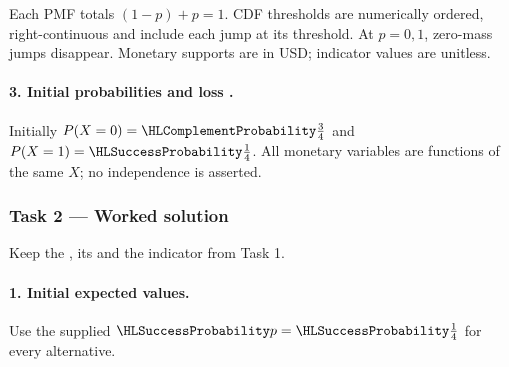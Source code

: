 Each PMF totals $(1-p)+p=1$. CDF thresholds are numerically ordered,
right-continuous and include each jump at its threshold. At $p=0,1$, zero-mass jumps disappear.
Monetary supports are in USD; indicator values are unitless.
\paragraph{3. Initial probabilities and loss \protect{}.}
Initially $P(X=0)=\FailureProb{\frac{3}{4}}$ and $P(X=1)=\SuccessProb{\frac{1}{4}}$.
All monetary variables are functions of the same $X$; no independence is asserted.
\clearpage\subsubsection*{Task 2 --- Worked solution}\label{sol:c3-energy-decision}
Keep the , its  and the indicator from Task 1.
\paragraph{1. Initial expected values.}
Use the supplied $\SuccessProb{p}=\SuccessProb{\frac{1}{4}}$ for every alternative.

